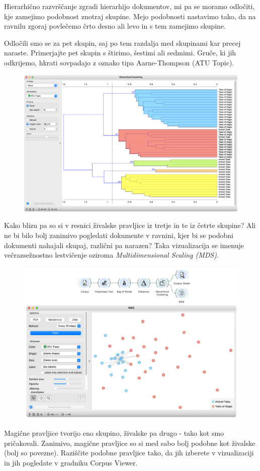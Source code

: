 \newpage

Hierarhično razvrščanje zgradi hierarhijo dokumentov, mi pa se moramo odločiti, kje zamejimo podobnost znotraj skupine. Mejo podobnosti nastavimo tako, da na ravnilu zgoraj povlečemo črto desno ali levo in s tem zamejimo skupine.

Odločili smo se za pet skupin, saj po tem razdalja med skupinami kar precej naraste. Primerjajte pet skupin s štirimo, šestimi ali sedmimi. Gruče, ki jih odkrijemo, hkrati sovpadajo z oznako tipa Aarne-Thompson (ATU Topic).

\begin{figure}[h]
    \includegraphics[width=\linewidth]{hc-clusters.png}%
    \caption{ }
    \label{fig:005-hc-clusters}
\end{figure}

\newpage

Kako blizu pa so si v resnici živalske pravljice iz tretje in te iz četrte skupine? Ali ne bi bilo bolj zanimivo pogledati dokumente v ravnini, kjer bi se podobni dokumenti nahajali skupaj, različni pa narazen? Taka vizualizacija se imenuje večrazsežnostno lestvičenje oziroma \textit{Multidimensional Scaling (MDS)}.

\begin{figure}[h]
    \includegraphics[width=\linewidth]{mds.png}%
    \caption{ }
    \label{fig:005-mds}
\end{figure}

Magične pravljice tvorijo eno skupino, živalske pa drugo - tako kot smo pričakovali. Zanimivo, magične pravljice so si med sabo bolj podobne kot živalske (bolj so povezne). Raziščite podobne pravljice tako, da jih izberete v vizualizaciji in jih pogledate v gradniku Corpus Viewer.